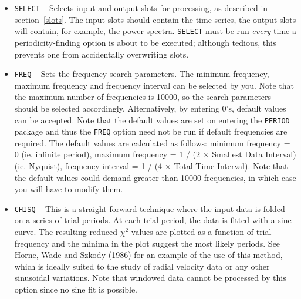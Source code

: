 \begin{itemize}

\item {\tt SELECT} -- Selects input and output slots for processing, as
described in section~\ref{slots}. The input slots should contain the
time-series, the output slots will contain, for example, the power spectra.
{\tt SELECT} must be run {\em every} time a periodicity-finding option is
about to be executed; although tedious, this prevents one from accidentally 
overwriting slots.

\item {\tt FREQ} -- Sets the frequency search parameters. The minimum frequency,
maximum frequency and frequency interval can be selected by you. Note that the
maximum number of frequencies is 10000, so the search parameters should be
selected accordingly. Alternatively, by entering 0's, default values can be
accepted. Note that the default values are set on entering the {\tt PERIOD}
package and thus the {\tt FREQ} option need not be run if default frequencies
are required. The default values are calculated as follows: minimum frequency =
0 (ie. infinite period), maximum frequency = 1 / (2 $\times$ Smallest Data
Interval) (ie. Nyquist), frequency interval = 1 / (4 $\times$ Total Time
Interval). Note that the default values could demand greater than 10000
frequencies, in which case you will have to modify them.

\item {\tt CHISQ} -- This is a straight-forward technique where the input data
is folded on a series of trial periods. At each trial period, the data is
fitted with a sine curve. The resulting reduced-$\chi^2$ values are plotted as
a function of trial frequency and the minima in the plot suggest the most
likely periods. See Horne, Wade and Szkody (1986) for an example of the use of
this method, which is ideally suited to the study of radial velocity data or
any other sinusoidal variations. Note that windowed data cannot be processed
by this option since no sine fit is possible.


\end{itemize}
